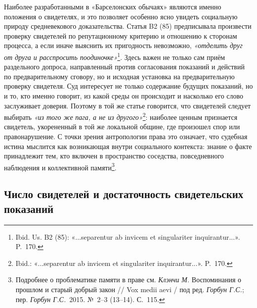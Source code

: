 Наиболее разработанными в «Барселонских обычаях» являются именно положения о свидетелях, и это позволяет особенно ясно увидеть социальную природу средневекового доказательства. Статья B2 (85) предписывала произвести проверку свидетелей по репутационному критерию и отношению к сторонам процесса, а если иначе выяснить их пригодность невозможно,\emph{ «отделить друг от друга и расспросить поодиночке»}\footnote{Ibid. Us. B2 (85): «...separentur ab invicem et singulariter inquirantur...». P.~170.}. Здесь важен не только сам приём раздельного допроса, направленный против согласования показаний и действий по предварительному сговору, но и исходная установка на предварительную проверку свидетеля. Суд интересует не только содержание будущих показаний, но и то, кто именно говорит, из какой среды он происходит и насколько его слово заслуживает доверия. Поэтому в той же статье говорится, что свидетелей следует выбирать \emph{«из того же }\emph{пага}\emph{, а не из другого»}\footnote{Ibid.: «...separentur ab invicem et singulariter inquirantur...». P.~170.}: наиболее ценным признается свидетель, укорененный в той же локальной общине, где произошел спор или правонарушение. С точки зрения антропологии права это означает, что судебная истина мыслится как возникающая внутри социального контекста: знание о факте принадлежит тем, кто включен в пространство соседства, повседневного наблюдения и коллективной памяти\footnote{Подробнее о проблематике памяти в праве см. \emph{Клэнчи}\emph{ М.} Воспоминания о прошлом и старый добрый закон // Vox medii aevi / под ред. \emph{Горбун Г.С.}; пер. \emph{Горбун Г.С.}~2015. №~2--3 (13--14). С.~115.}.

\subsection{Число свидетелей и достаточность свидетельских показаний}

